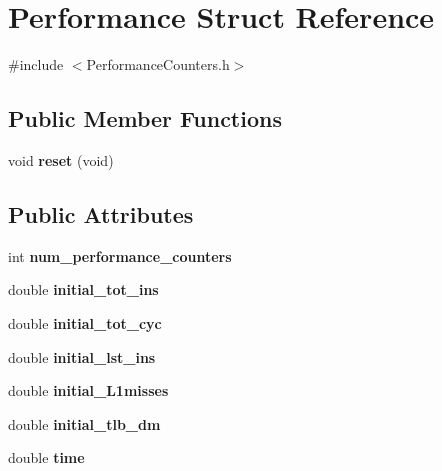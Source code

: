 \hypertarget{structPerformance}{\section{Performance Struct Reference}
\label{structPerformance}
}


{\ttfamily \#include $<$Performance\-Counters.\-h$>$}

\subsection*{Public Member Functions}
\begin{DoxyCompactItemize}
\item 
\hypertarget{structPerformance_a487d0bd5f7e07e516faf16def16d847f}{void {\bfseries reset} (void)}\label{structPerformance_a487d0bd5f7e07e516faf16def16d847f}

\end{DoxyCompactItemize}
\subsection*{Public Attributes}
\begin{DoxyCompactItemize}
\item 
\hypertarget{structPerformance_a46b912e5250284e086eae918593ea80d}{int {\bfseries num\-\_\-performance\-\_\-counters}}\label{structPerformance_a46b912e5250284e086eae918593ea80d}

\item 
\hypertarget{structPerformance_ae4f81f358bb251363fd30b1af212e587}{double {\bfseries initial\-\_\-tot\-\_\-ins}}\label{structPerformance_ae4f81f358bb251363fd30b1af212e587}

\item 
\hypertarget{structPerformance_aba1f3bc10aae0d5ee9294b79fbef41c9}{double {\bfseries initial\-\_\-tot\-\_\-cyc}}\label{structPerformance_aba1f3bc10aae0d5ee9294b79fbef41c9}

\item 
\hypertarget{structPerformance_aa22796680433fbf6ea9e7c0b3671e2bc}{double {\bfseries initial\-\_\-lst\-\_\-ins}}\label{structPerformance_aa22796680433fbf6ea9e7c0b3671e2bc}

\item 
\hypertarget{structPerformance_a47d5e630cab47e7db419244884b6c67c}{double {\bfseries initial\-\_\-\-L1misses}}\label{structPerformance_a47d5e630cab47e7db419244884b6c67c}

\item 
\hypertarget{structPerformance_abaa76cc9c0565e882f39ce7e67280c60}{double {\bfseries initial\-\_\-tlb\-\_\-dm}}\label{structPerformance_abaa76cc9c0565e882f39ce7e67280c60}

\item 
\hypertarget{structPerformance_a6ecd82d6779e5862c75ec9978fbcc507}{double {\bfseries time}}\label{structPerformance_a6ecd82d6779e5862c75ec9978fbcc507}

\end{DoxyCompactItemize}


